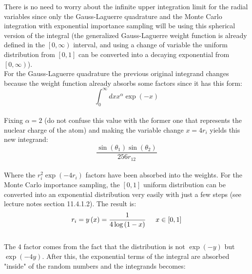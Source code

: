 \documentclass[11pt,a4paper,oneside]{article}
\begin{document}
		There is no need to worry about the infinite upper integration limit for the radial variables since only the Gauss-Laguerre quadrature and the Monte Carlo integration with exponential importance sampling will be using this spherical version of the integral (the generalized Gauss-Laguerre weight function is already defined in the $\left[0,\infty\right)$ interval, and using a change of variable the uniform distribution from $\left[0,1\right]$ can be converted into a decaying exponential from $\left[0,\infty\right)$).\\
		
		For the Gauss-Laguerre quadrature the previous original integrand changes because the weight function already absorbs some factors since it has this form:\\
		
		\begin{equation*}\int_0^\infty{dxx^\alpha\exp{\left(-x\right)}}\end{equation*}\\
		
		Fixing $\alpha=2$ (do not confuse this value with the former one that represents the nuclear charge of the atom) and making the variable change $x=4r_i$ yields this new integrand:\\
		
		\begin{equation*}\frac{\sin{\left(\theta_1\right)}\sin{\left(\theta_2\right)}}{256r_{12}}\end{equation*}\\
		
		Where the $r_i^2\exp{\left(-4r_i\right)}$ factors have been absorbed into the weights. For the Monte Carlo importance sampling, the $\left[0,1\right]$ uniform distribution can be converted into an exponential distribution very easily with just a few steps (see lecture notes section 11.4.1.2). The result is:\\
		
		\begin{equation*}r_i=y\left(x\right)=\frac{1}{4\log{\left(1-x\right)}}\hspace{0.5 cm}x\in\left[0,1\right]\end{equation*}\\
		
		The $4$ factor comes from the fact that the distribution is not $\exp{\left(-y\right)}$ but $\exp{\left(-4y\right)}$. After this, the exponential terms of the integral are absorbed "inside" of the random numbers and the integrands becomes:\\
		
\end{document}
